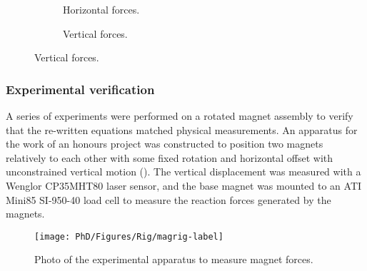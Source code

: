 \documentclass[11pt,a4paper]{memoir}
\begin{document}
\begin{figure}
  \begin{wide}
  \hspace{-1cm}%
  \begin{subfigure}
    \caption{Horizontal forces.}
  \end{subfigure}\qquad\hfil
  \begin{subfigure}
    \caption{Vertical forces.}
  \end{subfigure}
  \end{wide}
\end{figure}

\subsubsection{Experimental verification}

A series of experiments were performed on a rotated magnet assembly to verify that the re-written equations matched physical measurements.
An apparatus for the work of an honours project \cite{byfield2012-honoursthesis} was constructed to position two magnets relatively to each other with some fixed rotation and horizontal offset with unconstrained vertical motion ().
The vertical displacement was measured with a Wenglor CP35MHT80 laser sensor, and the base magnet was mounted to an ATI Mini85 SI-950-40 load cell to measure the reaction forces generated by the magnets.

\begin{figure}
\texttt{[image: PhD/Figures/Rig/magrig-label]}
\caption{Photo of the experimental apparatus to measure magnet forces.}
\end{figure}

\begin{figure}
\end{figure}
\end{document}
